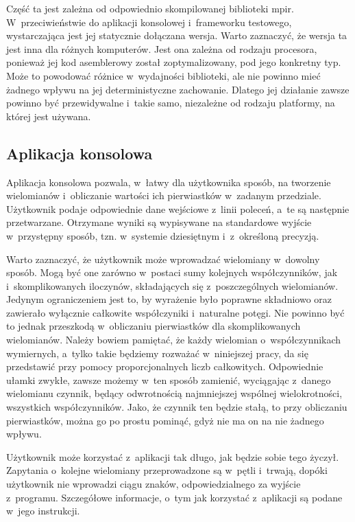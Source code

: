 Część ta jest zależna od odpowiednio skompilowanej biblioteki mpir. W~przeciwieństwie do aplikacji konsolowej i~frameworku testowego, wystarczająca jest jej statycznie dołączana wersja. Warto zaznaczyć, że wersja ta jest inna dla różnych komputerów. Jest ona zależna od rodzaju procesora, ponieważ jej kod asemblerowy został zoptymalizowany, pod jego konkretny typ. Może to powodować różnice w~wydajności biblioteki, ale nie powinno mieć żadnego wpływu na jej deterministyczne zachowanie. Dlatego jej działanie zawsze powinno być przewidywalne i~takie samo, niezależne od rodzaju platformy, na której jest używana.

\subsection{Aplikacja konsolowa}

Aplikacja konsolowa pozwala, w~łatwy dla użytkownika sposób, na tworzenie wielomianów i~obliczanie wartości ich pierwiastków w~zadanym przedziale. Użytkownik podaje odpowiednie dane wejściowe z~linii poleceń, a~te są następnie przetwarzane. Otrzymane wyniki są wypisywane na standardowe wyjście w~przystępny sposób, tzn. w~systemie dziesiętnym i~z~określoną precyzją.

Warto zaznaczyć, że użytkownik może wprowadzać wielomiany w~dowolny sposób. Mogą być one zarówno w~postaci sumy kolejnych współczynników, jak i~skomplikowanych iloczynów, składających się z~poszczególnych wielomianów. Jedynym ograniczeniem jest to, by wyrażenie było poprawne składniowo oraz zawierało wyłącznie całkowite współczyniki i~naturalne potęgi. Nie powinno być to jednak przeszkodą w~obliczaniu pierwiastków dla skomplikowanych wielomianów. Należy bowiem pamiętać, że każdy wielomian o~współczynnikach wymiernych, a~tylko takie będziemy rozważać w~niniejszej pracy, da się przedstawić przy pomocy proporcjonalnych liczb całkowitych. Odpowiednie ułamki zwykłe, zawsze możemy w~ten sposób zamienić, wyciągając z~danego wielomianu czynnik, będący odwrotnością najmniejszej wspólnej wielokrotności, wszystkich współczynników. Jako, że czynnik ten będzie stałą, to przy obliczaniu pierwiastków, można go po prostu pominąć, gdyż nie ma on na nie żadnego wpływu.

Użytkownik może korzystać z~aplikacji tak długo, jak będzie sobie tego życzył. Zapytania o~kolejne wielomiany przeprowadzone są w~pętli i~trwają, dopóki użytkownik nie wprowadzi ciągu znaków, odpowiedzialnego za wyjście z~programu. Szczegółowe informacje, o~tym jak korzystać z~aplikacji są podane w~jego instrukcji.

